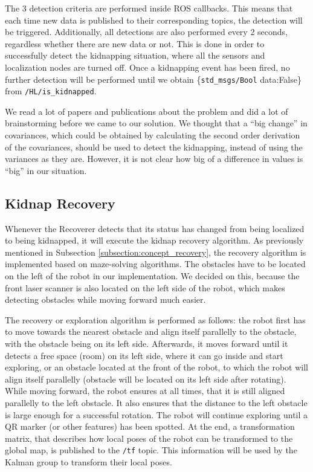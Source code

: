 The 3 detection criteria are performed inside ROS callbacks. This means that each time new data is published to their corresponding topics, the detection will be triggered. Additionally, all detections are also performed every 2 seconds, regardless whether there are new data or not. This is done in order to successfully detect the kidnapping situation, where all the sensors and localization nodes are turned off. Once a kidnapping event has been fired, no further detection will be performed until we obtain \{\texttt{std\_msgs/Bool} data:False\} from \texttt{/HL/is\_kidnapped}.

We read a lot of papers and publications about the problem and did a lot of brainstorming before we came to our solution. We thought that a ``big change'' in covariances, which could be obtained by calculating the second order derivation of the covariances, should be used to detect the kidnapping, instead of using the variances as they are. However, it is not clear how big of a difference in values is ``big'' in our situation.

\subsection{Kidnap Recovery} \label{subsection:implementation_recovery}

Whenever the Recoverer detects that its status has changed from being localized to being kidnapped, it will execute the kidnap recovery algorithm. As previously mentioned in Subsection \ref{subsection:concept_recovery}, the recovery algorithm is implemented based on maze-solving algorithms. The obstacles have to be located on the left of the robot in our implementation. We decided on this, because the front laser scanner is also located on the left side of the robot, which makes detecting obstacles while moving forward much easier.

The recovery or exploration algorithm is performed as follows: the robot first has to move towards the nearest obstacle and align itself parallelly to the obstacle, with the obstacle being on its left side. Afterwards, it moves forward until it detects a free space (room) on its left side, where it can go inside and start exploring, or an obstacle located at the front of the robot, to which the robot will align itself parallelly (obstacle will be located on its left side after rotating). While moving forward, the robot ensures at all times, that it is still aligned parallelly to the left obstacle. It also ensures that the distance to the left obstacle is large enough for a successful rotation. The robot will continue exploring until a QR marker (or other features) has been spotted. At the end, a transformation matrix, that describes how local poses of the robot can be transformed to the global map, is published to the \texttt{/tf} topic. This information will be used by the Kalman group to transform their local poses.

